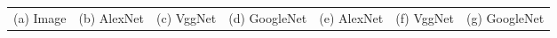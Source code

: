 \begin{figure}
\begin{center}
\begin{tabular}{ccccccc}
{\small (a) Image} &
{\small (b) AlexNet} &
{\small (c) VggNet} &
{\small (d) GoogleNet} &
{\small (e) AlexNet} &
{\small (f) VggNet} &
{\small (g) GoogleNet} \\
\end{tabular}

\end{center}
\end{figure}
